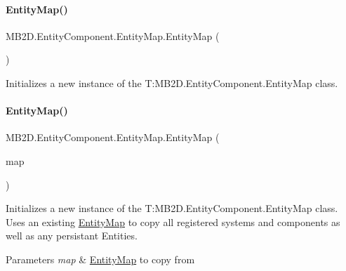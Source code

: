 \paragraph{\texorpdfstring{Entity\+Map()}{EntityMap()}\hspace{0.1cm}{\footnotesize\ttfamily [1/2]}}
{\footnotesize\ttfamily M\+B2\+D.\+Entity\+Component.\+Entity\+Map.\+Entity\+Map (\begin{DoxyParamCaption}{ }\end{DoxyParamCaption})\hspace{0.3cm}{\ttfamily [inline]}}



Initializes a new instance of the T\+:\+M\+B2\+D.\+Entity\+Component.\+Entity\+Map class. 

\hypertarget{class_m_b2_d_1_1_entity_component_1_1_entity_map_ac8f0662e42b90d8299e1044a1c429863}{}\label{class_m_b2_d_1_1_entity_component_1_1_entity_map_ac8f0662e42b90d8299e1044a1c429863} 
\paragraph{\texorpdfstring{Entity\+Map()}{EntityMap()}\hspace{0.1cm}{\footnotesize\ttfamily [2/2]}}
{\footnotesize\ttfamily M\+B2\+D.\+Entity\+Component.\+Entity\+Map.\+Entity\+Map (\begin{DoxyParamCaption}\item[{\hyperlink{class_m_b2_d_1_1_entity_component_1_1_entity_map}{Entity\+Map}}]{map }\end{DoxyParamCaption})\hspace{0.3cm}{\ttfamily [inline]}}



Initializes a new instance of the T\+:\+M\+B2\+D.\+Entity\+Component.\+Entity\+Map class. Uses an existing \hyperlink{class_m_b2_d_1_1_entity_component_1_1_entity_map}{Entity\+Map} to copy all registered systems and components as well as any persistant Entities. 


\begin{DoxyParams}{Parameters}
{\em map} & \hyperlink{class_m_b2_d_1_1_entity_component_1_1_entity_map}{Entity\+Map} to copy from\\
\hline
\end{DoxyParams}


